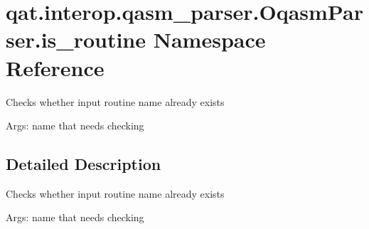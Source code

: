 \hypertarget{namespaceqat_1_1interop_1_1qasm__parser_1_1OqasmParser_1_1is__routine}{\section{qat.\-interop.\-qasm\-\_\-parser.\-Oqasm\-Parser.\-is\-\_\-routine Namespace Reference}
\label{namespaceqat_1_1interop_1_1qasm__parser_1_1OqasmParser_1_1is__routine}
}


\begin{DoxyVerb}Checks whether input routine name already exists
\end{DoxyVerb}
 Args\-: name that needs checking  




\subsection{Detailed Description}
\begin{DoxyVerb}Checks whether input routine name already exists
\end{DoxyVerb}
 Args\-: name that needs checking 